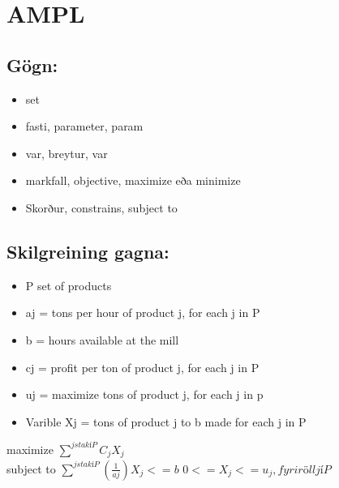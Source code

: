 \documentclass[]{article}
\begin{document}
\section*{AMPL}

\subsection*{Gögn:}
\begin{itemize}
	\item set
	\item fasti, parameter, param
	\item var, breytur, var
	\item markfall, objective, maximize eða minimize
	\item Skorður, constrains,  subject to
\end{itemize}

\subsection*{Skilgreining gagna:}
\begin{itemize}
	\item P set of products
	\item aj = tons per hour of product j, for each j in P
	\item b = hours available at the mill
	\item cj = profit per ton of product j, for each j in P
	\item uj = maximize tons of product j, for each j in p	
	\item Varible  Xj = tons of product j to b made for each j in P
\end{itemize}
maximize $\sum_{}^{j stak í P}C_{j}X_{j}$ \\
subject to $\sum_{}^{j stak í P}(\frac{1}{aj})X_{j} <= b$
$0 <= X_{j} <= u_{j}, fyrir öll j í P$
\end{document}
